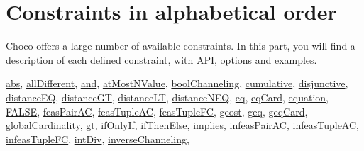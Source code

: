 \label{constraints}
\hypertarget{constraints}{}



\chapter{Constraints in alphabetical order}\label{constraints:constraintsinalphabeticalorder}\hypertarget{constraints:constraintsinalphabeticalorder}{}

Choco offers a large number of available constraints.
In this part, you will find a description of each defined constraint, with API, options and examples.
\begin{note}
	 \hyperlink{abs:absconstraint}{abs},
	 \hyperlink{alldifferent:alldifferentconstraint}{allDifferent},
	 \hyperlink{and:andconstraint}{and},
	 \hyperlink{atmostnvalue:atmostnvalueconstraint}{atMostNValue},
	 \hyperlink{boolchanneling:boolchannelingconstraint}{boolChanneling},
	 \hyperlink{cumulative:cumulativeconstraint}{cumulative},
	 \hyperlink{disjunctive:disjunctiveconstraint}{disjunctive},
	 \hyperlink{distanceeq:distanceeqconstraint}{distanceEQ},
	 \hyperlink{distancegt:distancegtconstraint}{distanceGT},
	 \hyperlink{distancelt:distanceltconstraint}{distanceLT},
	 \hyperlink{distanceneq:distanceneqconstraint}{distanceNEQ},
	 \hyperlink{eq:eqconstraint}{eq},
	 \hyperlink{eqcard:eqcardconstraint}{eqCard},
	 \hyperlink{equation:equationconstraint}{equation},
	 \hyperlink{false:falseconstraint}{FALSE},
	 \hyperlink{feaspairac:feaspairacconstraint}{feasPairAC},
	 \hyperlink{feastupleac:feastupleacconstraint}{feasTupleAC},
	 \hyperlink{feastuplefc:feastuplefcconstraint}{feasTupleFC},
	 \hyperlink{geost:geostconstraint}{geost},
	 \hyperlink{geq:geqconstraint}{geq},
	 \hyperlink{geqcard:geqcardconstraint}{geqCard},
	 \hyperlink{globalcardinality:globalcardinalityconstraint}{globalCardinality},
	 \hyperlink{gt:gtconstraint}{gt},
	 \hyperlink{ifonlyif:ifonlyifconstraint}{ifOnlyIf},
	 \hyperlink{ifthenelse:ifthenelseconstraint}{ifThenElse},
	 \hyperlink{implies:impliesconstraint}{implies},
	 \hyperlink{infeaspairac:infeaspairacconstraint}{infeasPairAC},
	 \hyperlink{infeastupleac:infeastupleacconstraint}{infeasTupleAC},
	 \hyperlink{infeastuplefc:infeastuplefcconstraint}{infeasTupleFC},
	 \hyperlink{intdiv:intdivconstraint}{intDiv},
	 \hyperlink{inversechanneling:inversechannelingconstraint}{inverseChanneling},

\end{note}
